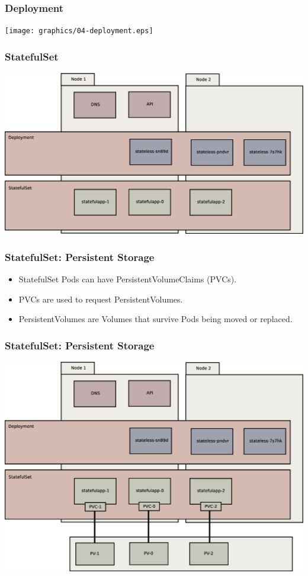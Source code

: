 \documentclass{beamer}
\begin{document}
\begin{frame}
    \frametitle{Deployment}
    \texttt{[image: graphics/04-deployment.eps]}
\end{frame}

\begin{frame}
    \frametitle{StatefulSet}
    \includegraphics[width=\textwidth,height=0.85\textheight,keepaspectratio]{graphics/05-statefulSet.eps}
\end{frame}

\begin{frame}
    \frametitle{StatefulSet: Persistent Storage}
    \begin{itemize}
        \item StatefulSet Pods can have PersistentVolumeClaims (PVCs).\pause
        \item PVCs are used to request PersistentVolumes.\pause
        \item PersistentVolumes are Volumes that survive Pods being moved or replaced.
    \end{itemize}
\end{frame}

\begin{frame}
    \frametitle{StatefulSet: Persistent Storage}
    \includegraphics[width=\textwidth,height=0.85\textheight,keepaspectratio]{graphics/06-persistence.eps}
\end{frame}
\end{document}

